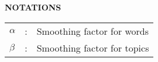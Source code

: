 \begin{center}
\Large{\textbf{NOTATIONS}}\\
\end{center}
\begin{table}[bpht!]
\centering
\begin{tabular}{lcl}
$\alpha$&:&Smoothing factor for words\\
$\beta$&:& Smoothing factor for topics
\end{tabular}
\end{table}